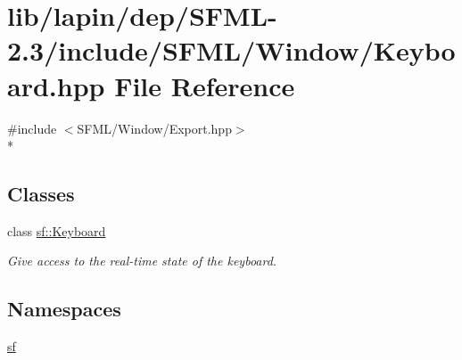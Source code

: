\hypertarget{lapin_2dep_2_s_f_m_l-2_83_2include_2_s_f_m_l_2_window_2_keyboard_8hpp}{\section{lib/lapin/dep/\-S\-F\-M\-L-\/2.3/include/\-S\-F\-M\-L/\-Window/\-Keyboard.hpp File Reference}
\label{lapin_2dep_2_s_f_m_l-2_83_2include_2_s_f_m_l_2_window_2_keyboard_8hpp}
}
{\ttfamily \#include $<$S\-F\-M\-L/\-Window/\-Export.\-hpp$>$}\\*
\subsection*{Classes}
\begin{DoxyCompactItemize}
\item 
class \hyperlink{classsf_1_1_keyboard}{sf\-::\-Keyboard}
\begin{DoxyCompactList}\small\item\em Give access to the real-\/time state of the keyboard. \end{DoxyCompactList}\end{DoxyCompactItemize}
\subsection*{Namespaces}
\begin{DoxyCompactItemize}
\item 
\hyperlink{namespacesf}{sf}
\end{DoxyCompactItemize}
